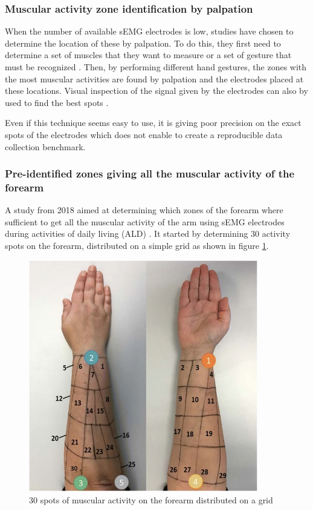 \documentclass{article}
\begin{document}
\subsubsection{Muscular activity zone identification by palpation}
	
	When the number of available sEMG electrodes is low, studies have chosen to determine the location of these by palpation. To do this, they first need to determine a set of muscles that they want to measure \cite{ref:Hioki2012} or a set of gesture that must be recognized \cite{ref:Ngeo2014, ref:comp6EMGsetup}. Then, by performing different hand gestures, the zones with the most muscular activities are found by palpation and the electrodes placed at these locations. Visual inspection of the signal given by the electrodes can also by used to find the best spots \cite{ref:Ngeo2014}.
	
	Even if this technique seems easy to use, it is giving poor precision on the exact spots of the electrodes which does not enable to create a reproducible data collection benchmark.
	
	
	\subsubsection{Pre-identified zones giving all the muscular activity of the forearm}
	
	A study from 2018 \cite{ref:identifiedEMGlocation} aimed at determining which zones of the forearm where sufficient to get all the muscular activity of the arm using sEMG electrodes during activities of daily living (ALD) \cite{ref:ADL1}. It started by determining 30 activity spots on the forearm, distributed on a simple grid as shown in figure \ref{fig:forearmActivityZones}.
	
	\begin{figure}[H]
		\centering
		\includegraphics[width=10cm]{images/forearmActivityZones.png}
		\caption{30 spots of muscular activity on the forearm distributed on a grid \cite{ref:identifiedEMGlocation}}
		\label{fig:forearmActivityZones}
	\end{figure}
	
\end{document}
